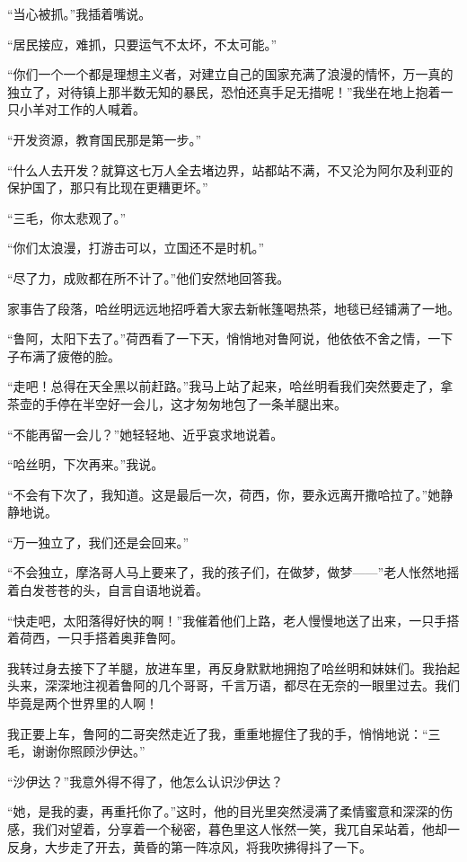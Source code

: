 \par “当心被抓。”我插着嘴说。
\par “居民接应，难抓，只要运气不太坏，不太可能。”
\par “你们一个一个都是理想主义者，对建立自己的国家充满了浪漫的情怀，万一真的独立了，对待镇上那半数无知的暴民，恐怕还真手足无措呢！”我坐在地上抱着一只小羊对工作的人喊着。
\par “开发资源，教育国民那是第一步。”
\par “什么人去开发？就算这七万人全去堵边界，站都站不满，不又沦为阿尔及利亚的保护国了，那只有比现在更糟更坏。”
\par “三毛，你太悲观了。”
\par “你们太浪漫，打游击可以，立国还不是时机。”
\par “尽了力，成败都在所不计了。”他们安然地回答我。
\par 家事告了段落，哈丝明远远地招呼着大家去新帐篷喝热茶，地毯已经铺满了一地。
\par “鲁阿，太阳下去了。”荷西看了一下天，悄悄地对鲁阿说，他依依不舍之情，一下子布满了疲倦的脸。
\par “走吧！总得在天全黑以前赶路。”我马上站了起来，哈丝明看我们突然要走了，拿茶壶的手停在半空好一会儿，这才匆匆地包了一条羊腿出来。
\par “不能再留一会儿？”她轻轻地、近乎哀求地说着。
\par “哈丝明，下次再来。”我说。
\par “不会有下次了，我知道。这是最后一次，荷西，你，要永远离开撒哈拉了。”她静静地说。
\par “万一独立了，我们还是会回来。”
\par “不会独立，摩洛哥人马上要来了，我的孩子们，在做梦，做梦——”老人怅然地摇着白发苍苍的头，自言自语地说着。
\par “快走吧，太阳落得好快的啊！”我催着他们上路，老人慢慢地送了出来，一只手搭着荷西，一只手搭着奥菲鲁阿。
\par 我转过身去接下了羊腿，放进车里，再反身默默地拥抱了哈丝明和妹妹们。我抬起头来，深深地注视着鲁阿的几个哥哥，千言万语，都尽在无奈的一眼里过去。我们毕竟是两个世界里的人啊！
\par 我正要上车，鲁阿的二哥突然走近了我，重重地握住了我的手，悄悄地说：“三毛，谢谢你照顾沙伊达。”
\par “沙伊达？”我意外得不得了，他怎么认识沙伊达？
\par “她，是我的妻，再重托你了。”这时，他的目光里突然浸满了柔情蜜意和深深的伤感，我们对望着，分享着一个秘密，暮色里这人怅然一笑，我兀自呆站着，他却一反身，大步走了开去，黄昏的第一阵凉风，将我吹拂得抖了一下。

